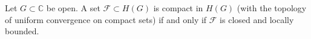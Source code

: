 Let $G \subset \mathbb{C}$ be open. A set $\mathcal{F} \subset H(G)$ is compact in $H(G)$ (with the topology of uniform convergence on compact sets) if and only if $\mathcal{F}$ is closed and locally bounded.
